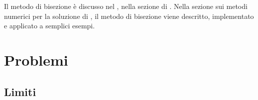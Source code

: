 \documentclass[letterpaper,10pt,italian]{jupyterBook}
\begin{document}
\sphinxAtStartPar
Il metodo di bisezione è discusso nel , nella sezione di . Nella sezione sui metodi numerici per la soluzione di , il metodo di bisezione viene descritto, implementato e applicato a semplici esempi.



\sphinxstepscope


\section{Problemi}
\label{\detokenize{ch/infinitesimal_calculus/analysis-problems:problemi}}\label{\detokenize{ch/infinitesimal_calculus/analysis-problems:infinitesimal-calculus-analysis-problems}}\label{\detokenize{ch/infinitesimal_calculus/analysis-problems::doc}}

\subsection{Limiti}
\label{\detokenize{ch/infinitesimal_calculus/analysis-problems:limiti}} \label{exercise:ch/infinitesimal_calculus/analysis-problems-exercise-0}
\end{document}
